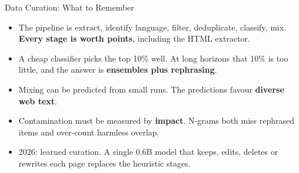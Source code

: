 \begin{frame}{Data Curation: What to Remember}
    \begin{itemize}\itemsep0.45em
        \item The pipeline is extract, identify language, filter, deduplicate, classify, mix. \textbf{Every stage is worth points}, including the HTML extractor.
        \item A cheap classifier picks the top 10\% well. At long horizons that 10\% is too little, and the answer is \textbf{ensembles plus rephrasing}.
        \item Mixing can be predicted from small runs. The predictions favour \textbf{diverse web text}.
        \item Contamination must be measured by \textbf{impact}. N-grams both miss rephrased items and over-count harmless overlap.
        \item 2026: learned curation. A single 0.6B model that keeps, edits, deletes or rewrites each page replaces the heuristic stages.
    \end{itemize}
    \vspace{0.3em}
\end{frame}
